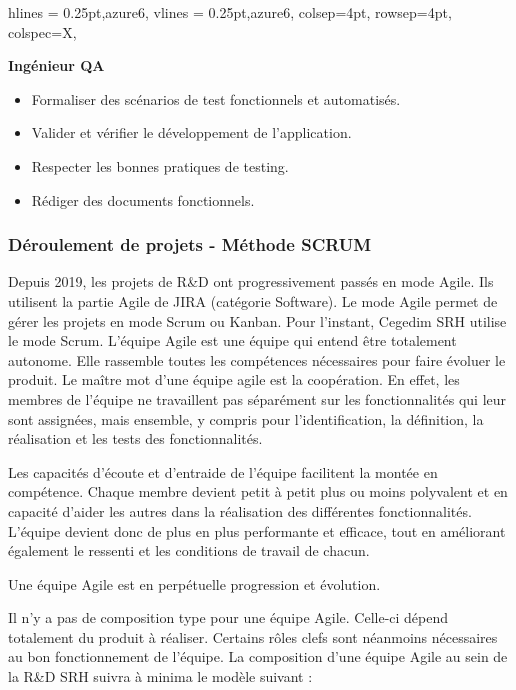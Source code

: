 \begin{longtblr}[caption={Responsabilités et missions des différents acteurs de l'équipe QA}, label={tab:qa}]{
    hlines = {0.25pt,azure6},
    vlines = {0.25pt,azure6},
    colsep=4pt,
    rowsep=4pt,
	colspec={X},
}
    \begin{minipage}{\linewidth}
    {
        \textbf{Ingénieur QA}\\
    }
    \begin{itemize}
        \item Formaliser des scénarios de test fonctionnels et automatisés.
        \item Valider et vérifier le développement de l’application.
        \item Respecter les bonnes pratiques de testing.
        \item Rédiger des documents fonctionnels.\\
    \end{itemize}
\end{minipage}
\end{longtblr}

\subsubsection{Déroulement de projets - Méthode SCRUM}
Depuis 2019, les projets de R\&D ont progressivement passés en mode Agile. Ils utilisent la partie Agile de JIRA (catégorie Software).
Le mode Agile permet de gérer les projets en mode Scrum ou Kanban. Pour l'instant, Cegedim SRH utilise le mode Scrum.
L'équipe Agile est une équipe qui entend être totalement autonome. Elle rassemble toutes les compétences nécessaires pour faire évoluer le produit. Le maître mot d'une équipe agile est la coopération. En effet, les membres de l'équipe ne travaillent pas séparément sur les fonctionnalités qui leur sont assignées, mais ensemble, y compris pour l'identification, la définition, la réalisation et les tests des fonctionnalités.

Les capacités d’écoute et d’entraide de l’équipe facilitent la montée en compétence. Chaque membre devient petit à petit plus ou moins polyvalent et en capacité d'aider les autres dans la réalisation des différentes fonctionnalités. L’équipe devient donc de plus en plus performante et efficace, tout en améliorant également le ressenti et les conditions de travail de chacun.
\begin{beware}
Une équipe Agile est en perpétuelle progression et évolution.
\end{beware}
Il n'y a pas de composition type pour une équipe Agile. Celle-ci dépend totalement du produit à réaliser. Certains rôles clefs sont néanmoins nécessaires au bon fonctionnement de l'équipe.
 La composition d'une équipe Agile au sein de la R\&D SRH suivra à minima le modèle suivant :


